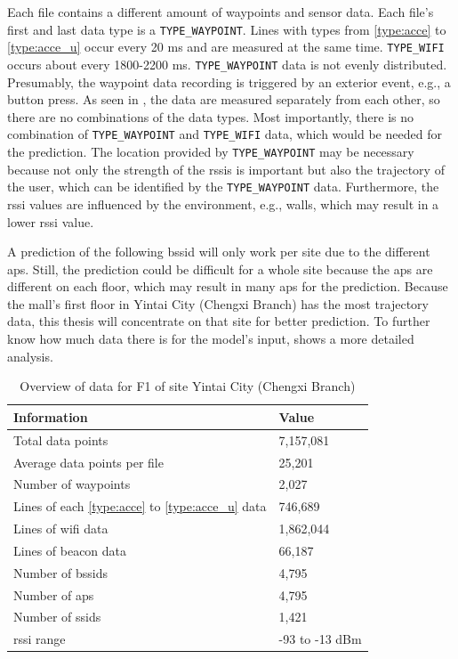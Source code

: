 Each file contains a different amount of waypoints and sensor data.
Each file's first and last data type is a \texttt{TYPE\_WAYPOINT}.
Lines with types from \ref{type:acce} to \ref{type:acce_u} occur every 20 ms and are measured at the same time.
\texttt{TYPE\_WIFI} occurs about every 1800-2200 ms.
\texttt{TYPE\_WAYPOINT} data is not evenly distributed.
Presumably, the waypoint data recording is triggered by an exterior event, e.g., a button press. 
As seen in , the data are measured separately from each other, so there are no combinations of the data types.
Most importantly, there is no combination of \texttt{TYPE\_WAYPOINT} and \texttt{TYPE\_WIFI} data, which would be needed for the prediction.
The location provided by \texttt{TYPE\_WAYPOINT} may be necessary because not only the strength of the \acp{rssi} is important but also the trajectory of the user, which can be identified by the \texttt{TYPE\_WAYPOINT} data.
Furthermore, the \ac{rssi} values are influenced by the environment, e.g., walls, which may result in a lower \ac{rssi} value.

A prediction of the following \ac{bssid} will only work per site due to the different \acp{ap}.
Still, the prediction could be difficult for a whole site because the \acp{ap} are different on each floor, which may result in many \acp{ap} for the prediction.
Because the mall's first floor in Yintai City (Chengxi Branch) has the most trajectory data, this thesis will concentrate on that site for better prediction.
To further know how much data there is for the model's input,  shows a more detailed analysis.

\begin{table}[h]
    \centering
    \caption{Overview of data for F1 of site Yintai City (Chengxi Branch)}
    \begin{tabular}{|l|l|}
    \hline
    \textbf{Information} & \textbf{Value} \\ \hline
    Total data points & 7,157,081 \\ \hline
    Average data points per file & 25,201 \\ \hline
    Number of waypoints & 2,027 \\ \hline
    Lines of each \ref{type:acce} to \ref{type:acce_u} data & 746,689 \\ \hline
    Lines of \ac{wifi} data & 1,862,044 \\ \hline
    Lines of beacon data & 66,187 \\ \hline
    Number of \acp{bssid} & 4,795 \\ \hline
    Number of \acp{ap} & 4,795 \\ \hline
    Number of \acp{ssid} & 1,421 \\ \hline
    \ac{rssi} range & -93 to -13 dBm \\ \hline
    \end{tabular}
\label{tab:data_summary}
\end{table}


